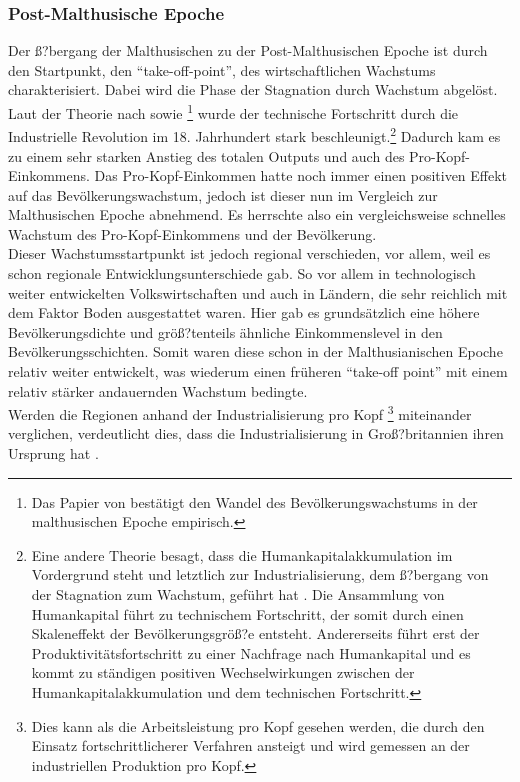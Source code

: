 \subsubsection*{Post-Malthusische Epoche}
%
Der ß?bergang der Malthusischen zu der Post-Malthusischen Epoche ist durch den Startpunkt, den "`take-off-point"', des wirtschaftlichen Wachstums charakterisiert. Dabei wird die Phase der Stagnation durch Wachstum abgelöst. 
Laut der Theorie nach \cite{Hansen.2002} sowie \cite{Ashraf.2008}\footnote{Das Papier von \cite{Ashraf.2008} bestätigt den Wandel des Bevölkerungswachstums in der malthusischen Epoche empirisch.} wurde der technische Fortschritt  durch die Industrielle Revolution im 18. Jahrhundert stark beschleunigt.\footnote{Eine andere Theorie besagt, dass die Humankapitalakkumulation im Vordergrund steht und letztlich zur Industrialisierung, dem ß?bergang von der Stagnation zum Wachstum, geführt hat \cite{Galor.2000}. Die Ansammlung von Humankapital führt zu technischem Fortschritt, der somit durch einen Skaleneffekt der Bevölkerungsgröß?e entsteht. Andererseits führt erst der Produktivitätsfortschritt zu einer Nachfrage nach Humankapital und es kommt zu ständigen positiven Wechselwirkungen zwischen der Humankapitalakkumulation und dem technischen Fortschritt.} Dadurch kam es zu einem sehr starken Anstieg des totalen Outputs und auch des Pro-Kopf-Einkommens. Das Pro-Kopf-Einkommen hatte noch immer einen positiven Effekt auf das Bevölkerungswachstum, jedoch ist dieser nun im Vergleich zur Malthusischen Epoche  abnehmend. Es herrschte also ein vergleichsweise schnelles Wachstum des Pro-Kopf-Einkommens und der Bevölkerung. \\ Dieser Wachstumsstartpunkt ist jedoch regional verschieden, vor allem, weil es schon regionale Entwicklungsunterschiede gab. So vor allem in technologisch weiter entwickelten Volkswirtschaften und auch in Ländern, die sehr reichlich mit dem Faktor Boden ausgestattet waren. Hier gab es grundsätzlich eine höhere Bevölkerungsdichte und größ?tenteils ähnliche Einkommenslevel in den Bevölkerungsschichten. Somit waren diese schon in der Malthusianischen Epoche relativ weiter entwickelt, was wiederum einen früheren "`take-off point"' mit einem relativ stärker andauernden Wachstum bedingte.\\ Werden die Regionen anhand der Industrialisierung pro Kopf \footnote{Dies kann als die Arbeitsleistung pro Kopf gesehen werden, die durch den Einsatz fortschrittlicherer Verfahren ansteigt und wird gemessen an der industriellen Produktion pro Kopf.} miteinander verglichen, verdeutlicht dies, dass die Industrialisierung in Groß?britannien ihren Ursprung hat \cite{Galor.2014}.\\
